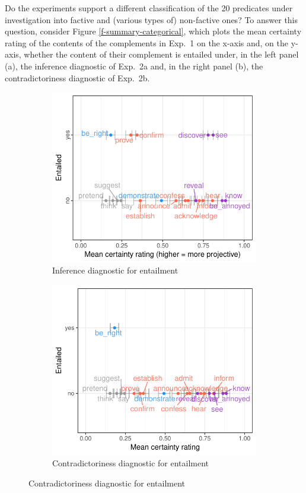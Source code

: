 \documentclass[11pt,fleqn]{article}
\newcommand{\6}{\mbox{$[\hspace*{-.6mm}[$}}
\newcommand{\9}{\mbox{$]\hspace*{-.6mm}]$}}
\begin{document}
{Do the experiments support a different classification of the 20 predicates under investigation into factive and (various types of) non-factive ones? To answer this question, consider Figure \ref{f-summary-categorical}, which plots the mean certainty rating of the contents of the complements in Exp.~1 on the x-axis and, on the y-axis, whether the content of their complement is entailed under, in the left panel (a), the inference diagnostic of Exp.~2a and, in the right panel (b), the contradictoriness diagnostic of Exp.~2b. 

\begin{figure}[h]

\begin{subfigure}{.5\textwidth}
\centering
\includegraphics[width=.35\paperwidth]{../results/5-projectivity-no-fact/graphs/projection-by-inferenceEntailment}
\caption{Inference diagnostic for entailment}
\end{subfigure}%
\begin{subfigure}{.5\textwidth}
\centering
\includegraphics[width=.35\paperwidth]{../results/5-projectivity-no-fact/graphs/projection-by-contradictorinessEntailment}
\caption{Contradictoriness diagnostic for entailment}
\end{subfigure}


\end{figure}}
\end{document}
